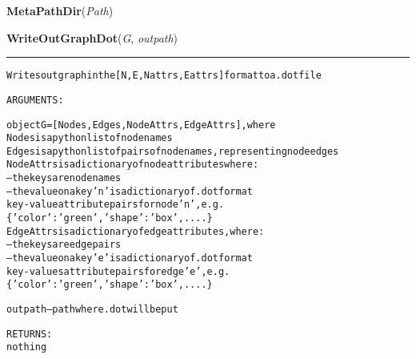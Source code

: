     \label{System:SystemGraphOperations:MetaPathDir}

    \vspace{0.5ex}

\hspace{.8\funcindent}\begin{boxedminipage}{\funcwidth}

    \raggedright \textbf{MetaPathDir}(\textit{Path})

\setlength{\parskip}{2ex}
\setlength{\parskip}{1ex}
    \end{boxedminipage}

    \label{System:SystemGraphOperations:WriteOutGraphDot}

    \vspace{0.5ex}

\hspace{.8\funcindent}\begin{boxedminipage}{\funcwidth}

    \raggedright \textbf{WriteOutGraphDot}(\textit{G}, \textit{outpath})

    \vspace{-1.5ex}

    \rule{\textwidth}{0.5\fboxrule}
\setlength{\parskip}{2ex}
\begin{alltt}

Writes out graph in the [N,E,Nattrs,Eattrs] format to a .dot file

ARGUMENTS:

object G = [Nodes,Edges,NodeAttrs,EdgeAttrs], where
        Nodes is a python list of node names
        Edges is a python list of pairs of node names, representing node edges
        NodeAttrs is a dictionary of node attributes where:
                -- the keys are node names
                -- the value on a key 'n' is a dictionary of .dot format 
                key-value attribute pairs for node 'n', e.g.
                \{'color':'green','shape':'box', .... \} 
        EdgeAttrs is a dictionary of edge  attributes, where:
                -- the keys are edge pairs
                -- the value on a key 'e' is a dictionary of .dot format 
                key-values attribute pairs for edge 'e', e.g. 
                \{'color':'green','shape':'box', .... \} 

        
outpath -- path where .dot will be put
        
RETURNS:
        nothing
\end{alltt}

\setlength{\parskip}{1ex}
    \end{boxedminipage}

